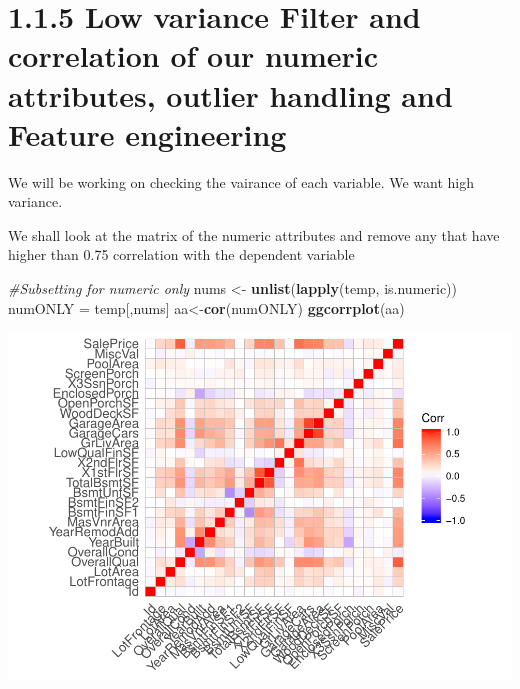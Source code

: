 \documentclass[]{article}
\newenvironment{Shaded}{\begin{snugshade}}{\end{snugshade}}
\newcommand{\KeywordTok}[1]{\textcolor[rgb]{0.13,0.29,0.53}{\textbf{#1}}}
\newcommand{\StringTok}[1]{\textcolor[rgb]{0.31,0.60,0.02}{#1}}
\newcommand{\CommentTok}[1]{\textcolor[rgb]{0.56,0.35,0.01}{\textit{#1}}}
\newcommand{\OtherTok}[1]{\textcolor[rgb]{0.56,0.35,0.01}{#1}}
\newcommand{\NormalTok}[1]{#1}
\begin{document}
\section{1.1.5 Low variance Filter and correlation of our numeric
attributes, outlier handling and Feature
engineering}\label{low-variance-filter-and-correlation-of-our-numeric-attributes-outlier-handling-and-feature-engineering}

We will be working on checking the vairance of each variable. We want
high variance.

\begin{Shaded}
\end{Shaded}

We shall look at the matrix of the numeric attributes and remove any
that have higher than 0.75 correlation with the dependent variable

\begin{Shaded}
\begin{Highlighting}[]
\CommentTok{#Subsetting for numeric only}
\NormalTok{nums <-}\StringTok{ }\KeywordTok{unlist}\NormalTok{(}\KeywordTok{lapply}\NormalTok{(temp, is.numeric))}
\NormalTok{numONLY =}\StringTok{ }\NormalTok{temp[,nums]}
\NormalTok{aa<-}\KeywordTok{cor}\NormalTok{(numONLY)}
\KeywordTok{ggcorrplot}\NormalTok{(aa)}
\end{Highlighting}
\end{Shaded}

\includegraphics{EDA_files/figure-latex/unnamed-chunk-105-1.pdf}
\end{document}
